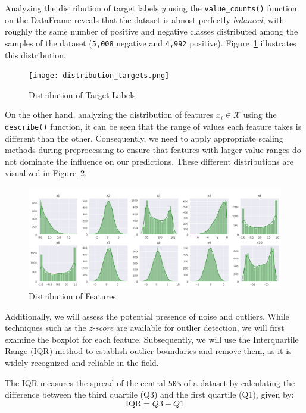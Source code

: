 Analyzing the distribution of target labels $y$ using the \texttt{value\_counts()} function on the DataFrame reveals that the dataset is almost perfectly \textit{balanced}, with roughly the same number of positive and negative classes distributed among the samples of the dataset (\texttt{5,008} negative and \texttt{4,992} positive). Figure~\ref{fig:distribution_targets} illustrates this distribution.

\begin{figure}[h]
    \centering
    \texttt{[image: distribution\_targets.png]}
    \caption{Distribution of Target Labels}
    \label{fig:distribution_targets}
\end{figure}

On the other hand, analyzing the distribution of features $x_i \in \mathcal{X}$ using the \texttt{describe()} function, it can be seen that the range of values each feature takes is different than the other. Consequently, we need to apply appropriate scaling methods during preprocessing to ensure that features with larger value ranges do not dominate the influence on our predictions. These different distributions are visualized in Figure~\ref{fig:distribution_features}.

\begin{figure}[h]
    \centering
    \includegraphics[width=\linewidth]{images/distribution_features.png}
    \caption{Distribution of Features}
    \label{fig:distribution_features}
\end{figure}

Additionally, we will assess the potential presence of noise and outliers. While techniques such as the \textit{z-score} are available for outlier detection, we will first examine the boxplot for each feature. Subsequently, we will use the Interquartile Range (IQR) method to establish outlier boundaries and remove them, as it is widely recognized and reliable in the field.

The IQR measures the spread of the central \texttt{50\%} of a dataset by calculating the difference between the third quartile (Q3) and the first quartile (Q1), given by:
\begin{equation}
    \text{IQR} = Q3 - Q1
\end{equation}

